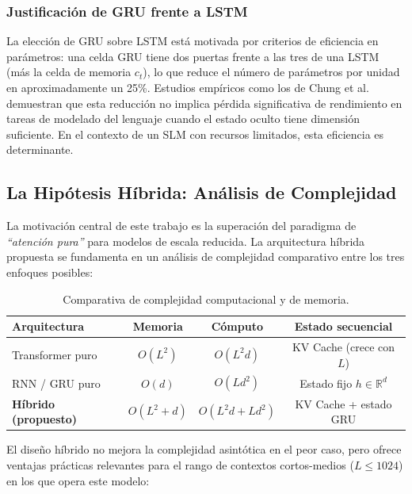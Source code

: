 \subsubsection{Justificación de GRU frente a LSTM}

La elección de GRU sobre LSTM está motivada por criterios de eficiencia en parámetros: una celda GRU tiene dos puertas frente a las tres de una LSTM (más la celda de memoria $c_t$), lo que reduce el número de parámetros por unidad en aproximadamente un 25\%. Estudios empíricos como los de Chung et al.~\cite{chung2014empirical} demuestran que esta reducción no implica pérdida significativa de rendimiento en tareas de modelado del lenguaje cuando el estado oculto tiene dimensión suficiente. En el contexto de un SLM con recursos limitados, esta eficiencia es determinante.

\subsection{La Hipótesis Híbrida: Análisis de Complejidad}

La motivación central de este trabajo es la superación del paradigma de \textit{``atención pura''} para modelos de escala reducida. La arquitectura híbrida propuesta se fundamenta en un análisis de complejidad comparativo entre los tres enfoques posibles:

\begin{table}[H]
\centering
\begin{tabularx}{\textwidth}{|X|c|c|c|}
\hline
\textbf{Arquitectura} & \textbf{Memoria} & \textbf{Cómputo} & \textbf{Estado secuencial} \\ \hline
Transformer puro & $O(L^2)$ & $O(L^2 d)$ & KV Cache (crece con $L$) \\ \hline
RNN / GRU puro & $O(d)$ & $O(Ld^2)$ & Estado fijo $h \in \mathbb{R}^d$ \\ \hline
\textbf{Híbrido (propuesto)} & $O(L^2 + d)$ & $O(L^2 d + Ld^2)$ & KV Cache + estado GRU \\ \hline
\end{tabularx}
\caption{Comparativa de complejidad computacional y de memoria.}
\label{tab:complejidad}
\end{table}

El diseño híbrido no mejora la complejidad asintótica en el peor caso, pero ofrece ventajas prácticas relevantes para el rango de contextos cortos-medios ($L \leq 1024$) en los que opera este modelo:

